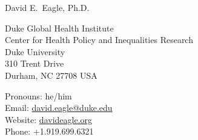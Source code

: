 \documentclass[12pt, letter]{article}
\makeatletter
\newcommand{\FirstName}{David E.}
\newcommand{\LastName}{Eagle}
\newcommand{\Degree}{Ph.D.}
\newcommand{\MyName}{\FirstName\ \LastName, \Degree}
\newcommand{\MyRole}{Assistant Research Professor}
\newcommand{\Email}{david.eagle@duke.edu}
\newcommand{\Website}{davideagle.org}
\newcommand{\Phone}{+1.919.699.6321}
\newcommand{\Affiliation}{
Duke Global Health Institute\\
Center for Health Policy and Inequalities Research\\
Duke University
}
\newcommand{\Address}{
    310 Trent Drive\\
    Durham, NC 27708 USA
}
\makeatother
\begin{document}
\setlength{\LTpre}{0pt}
\setlength{\LTpost}{2ex}

\thispagestyle{empty}

\begin{center}
    {\fontsize{24pt}{0}\selectfont \MyName}
    \\[0.3cm]
\end{center}

  \noindent
\begin{minipage}{.6\textwidth}
\Affiliation\\
\Address\\
\end{minipage}
\begin{minipage}{.4\textwidth}
\flushright
Pronouns: he/him\\
Email: \href{mailto:\Email}{\texttt\small{\Email}}\\
Website: {\texttt\small\href{\Website}{\Website}}\\
Phone: \Phone\\
\end{minipage}

\vspace{-1em}









%
\end{document}
